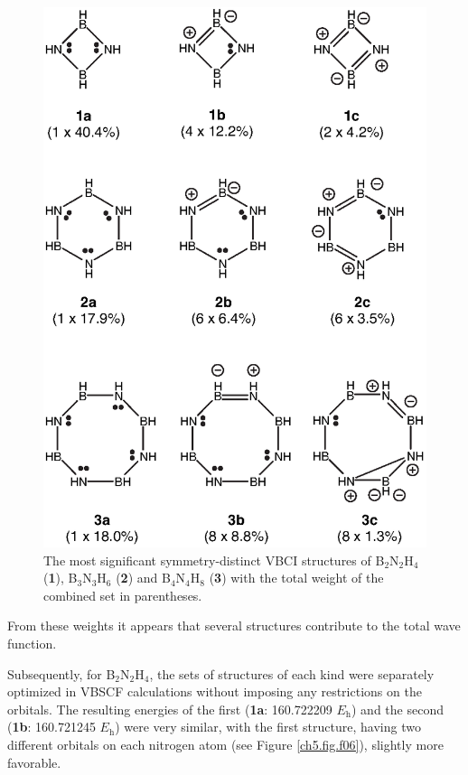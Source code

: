 \begin{figure}
\begin{center}
\includegraphics[scale=0.98]{huckel/figures/fig5.eps}
\end{center}
\caption{The most significant symmetry-distinct VBCI structures of
B$_2$N$_2$H$_4$ (\textbf{1}), B$_3$N$_3$H$_6$ (\textbf{2}) and B$_4$N$_4$H$_8$ (\textbf{3}) with the total weight of the combined
set in parentheses.}
\label{ch5.fig.f05}
\end{figure}
From these weights it appears that several structures contribute to the total wave function.

Subsequently, for B$_2$N$_2$H$_4$, the sets of structures of each kind were separately optimized in VBSCF calculations without imposing any
restrictions on the orbitals. The resulting energies of the first (\textbf{1a}:  160.722209 $E_\mathrm{h}$) and the second
(\textbf{1b}:  160.721245 $E_\mathrm{h}$) were very similar, with the first structure, having two different orbitals on each nitrogen atom
(see Figure \ref{ch5.fig.f06}), slightly more favorable.

